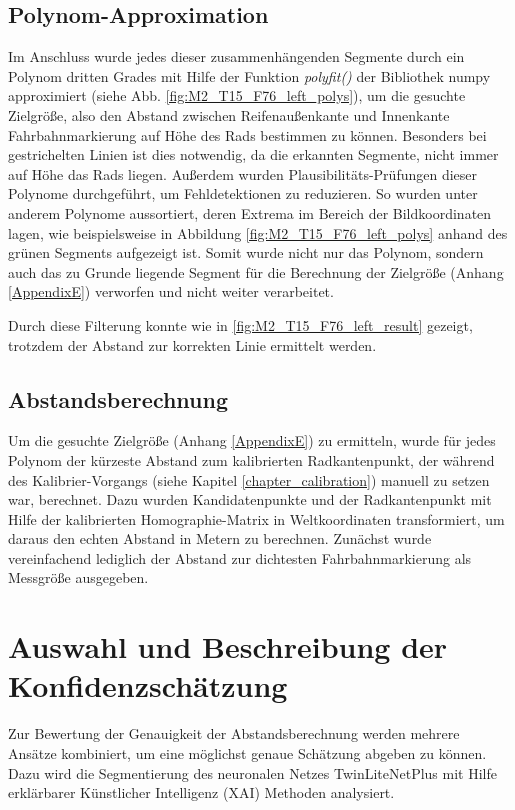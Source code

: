 \subsection{Polynom-Approximation}
    Im Anschluss wurde jedes dieser zusammenhängenden Segmente durch ein Polynom dritten Grades mit Hilfe der Funktion \textit{polyfit()} der Bibliothek numpy approximiert (siehe Abb. \ref{fig:M2_T15_F76_left_polys}), um die gesuchte Zielgrö{\ss}e, also den Abstand zwischen Reifenau{\ss}enkante und Innenkante Fahrbahnmarkierung auf Höhe des Rads bestimmen zu können. Besonders bei gestrichelten Linien ist dies notwendig, da die erkannten Segmente, nicht immer auf Höhe das Rads liegen.
    Au{\ss}erdem wurden Plausibilitäts-Prüfungen dieser Polynome durchgeführt, um Fehldetektionen zu reduzieren. So wurden unter anderem Polynome aussortiert, deren Extrema im Bereich der Bildkoordinaten lagen, wie beispielsweise in Abbildung \ref{fig:M2_T15_F76_left_polys} anhand des grünen Segments aufgezeigt ist. Somit wurde nicht nur das Polynom, sondern auch das zu Grunde liegende Segment für die Berechnung der Zielgrö{\ss}e (Anhang \ref{AppendixE}) verworfen und nicht weiter verarbeitet. 

    Durch diese Filterung konnte wie in \ref{fig:M2_T15_F76_left_result} gezeigt, trotzdem der Abstand zur korrekten Linie ermittelt werden.


\subsection{Abstandsberechnung}
    Um die gesuchte Zielgrö{\ss}e (Anhang \ref{AppendixE}) zu ermitteln, wurde für jedes Polynom der kürzeste Abstand zum kalibrierten Radkantenpunkt, der während des Kalibrier-Vorgangs (siehe Kapitel \ref{chapter_calibration}) manuell zu setzen war, berechnet. Dazu wurden Kandidatenpunkte und der Radkantenpunkt mit Hilfe der kalibrierten Homographie-Matrix in Weltkoordinaten transformiert, um daraus den echten Abstand in Metern zu berechnen. Zunächst wurde vereinfachend lediglich der Abstand zur dichtesten Fahrbahnmarkierung als Messgrö{\ss}e ausgegeben.

\section{Auswahl und Beschreibung der Konfidenzschätzung}
    \label{chapter_confidence}
    Zur Bewertung der Genauigkeit der Abstandsberechnung werden mehrere Ansätze kombiniert, um eine möglichst genaue Schätzung abgeben zu können. 
    Dazu wird die Segmentierung des neuronalen Netzes TwinLiteNetPlus mit Hilfe erklärbarer Künstlicher Intelligenz (XAI) Methoden analysiert.

